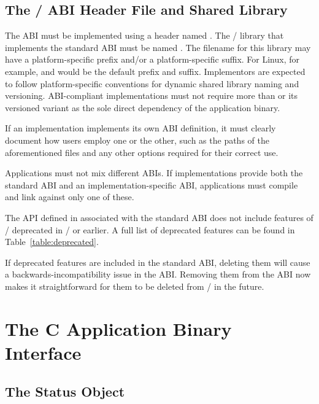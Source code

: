 \subsection{The \texorpdfstring{\MPI/}{MPI} ABI Header File and Shared Library}
\label{subsec:c-abi-filenames}

The ABI must be implemented using a header named .
The \MPI/ library that implements the standard ABI must be
named .
The filename for this library may have a platform-specific
prefix and/or a platform-specific suffix. For Linux, for example,
 and  would be the default prefix and suffix.
Implementors are expected to follow platform-specific conventions
for dynamic shared library naming and versioning.
ABI-compliant implementations must not require more than 
or its versioned variant as the sole direct dependency of the application binary.

\begin{implementors}
If an implementation implements its own ABI definition,
it must clearly document how users employ one or the other,
such as the paths of the aforementioned files and any
other options required for their correct use.
\end{implementors}

Applications must not mix different ABIs. 
If implementations provide both the standard ABI and 
an implementation-specific ABI, applications must compile 
and link against only one of these.

The API defined in  associated with the standard ABI
does not include features of \MPI/ deprecated in \MPIIIIDOTI/ or earlier.
A full list of deprecated features can be found in Table~\ref{table:deprecated}.

\begin{rationale}
If deprecated features are included in the standard ABI, deleting
them will cause a backwards-incompatibility issue in the ABI.
Removing them from the ABI now makes it straightforward for them
to be deleted from \MPI/ in the future.
\end{rationale}

\section{The C Application Binary Interface}
\label{sec:c-abi}

\subsection{The Status Object}

